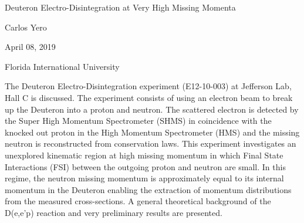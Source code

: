 \documentclass[a4paper]{article}
\begin{document}

\Large
 \begin{center}
Deuteron Electro-Disintegration at Very High Missing Momenta\\ 

\hspace{10pt}

\large
Carlos Yero \\

\hspace{10pt}

\small
April 08, 2019 \\

\hspace{10pt}

\small  
Florida International University\\

\end{center}

\hspace{10pt}

\normalsize

\noindent The Deuteron Electro-Disintegration experiment (E12-10-003) at Jefferson Lab, Hall C is discussed. The experiment
consists of using an electron beam to break up the Deuteron into a proton and neutron. The scattered electron is detected by the Super High
Momentum Spectrometer (SHMS) in coincidence with the knocked out proton in the High Momentum Spectrometer (HMS) and the missing neutron is reconstructed
from conservation laws. This experiment investigates an unexplored kinematic region at high missing momentum in which Final State Interactions (FSI)
between the outgoing proton and neutron are small. In this regime, the neutron missing momentum is approximately equal to its internal momentum in the
Deuteron enabling the extraction of momentum distributions from the measured cross-sections. A general theoretical background of the D(e,e'p) reaction and
very preliminary results are presented.
\end{document}
